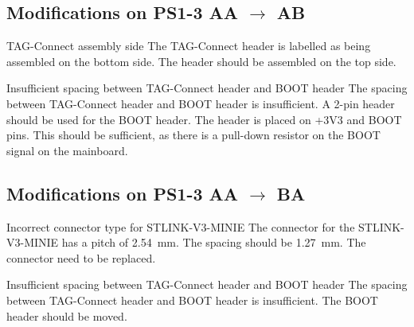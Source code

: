 \FloatBarrier

\subsection{Modifications on PS1-3 AA $\to$ AB}

\begin{ModTable}

\ModItemOpen
{TAG-Connect assembly side}
{The TAG-Connect header is labelled as being assembled on the bottom side. }
{The header should be assembled on the top side. }
{}
{}

\ModItemOpen
{Insufficient spacing between TAG-Connect header and BOOT header}
{The spacing between TAG-Connect header and BOOT header is insufficient. }
{A 2-pin header should be used for the BOOT header. The header is placed on +3V3 and BOOT pins. This should be sufficient, as there is a pull-down resistor on the BOOT signal on the mainboard. }
{}
{}

\end{ModTable}

\FloatBarrier

\subsection{Modifications on PS1-3 AA $\to$ BA}

\begin{ModTable}

\ModItemOpen
{Incorrect connector type for STLINK-V3-MINIE}
{The connector for the STLINK-V3-MINIE has a pitch of \qty{2.54}{\milli\meter}. The spacing should be \qty{1.27}{\milli\meter}. }
{The connector need to be replaced. }
{}
{}

\ModItemOpen
{Insufficient spacing between TAG-Connect header and BOOT header}
{The spacing between TAG-Connect header and BOOT header is insufficient. }
{The BOOT header should be moved. }
{}
{}

\end{ModTable}

\FloatBarrier

